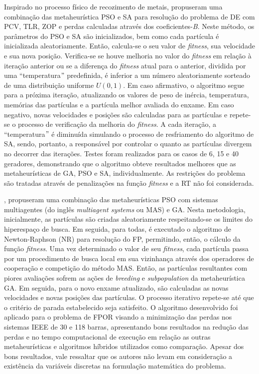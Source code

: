 \documentclass[
	12pt,				%
	openany,			%
	twoside,			%
	a4paper,			%
	chapter=TITLE,		%
	section=Title,		%
	subsection=Title,	%
	subsubsection=Title,%
	english,			%
	french,				%
	spanish,			%
	brazil			%
	]{abntex2}
\begin{document}
\begin{ERRATA}
Inspirado no processo físico de recozimento de metais,  propuseram uma combinação das metaheurística PSO e SA para resolução do problema de DE com PCV, TLR, ZOP e perdas calculadas através dos coeficientes-\emph{B}. Neste método, os parâmetros do PSO e SA são inicializados, bem como cada partícula é inicializada aleatoriamente. Então, calcula-se o seu valor de \emph{fitness}, sua velocidade e sua nova posição. Verifica-se se houve melhoria no valor do \emph{fitness} em relação à iteração anterior ou se a diferença do \emph{fitness} atual para o anterior, dividida por uma ``temperatura$"$ predefinida, é inferior a um número aleatoriamente sorteado de uma distribuição uniforme $U(0,1)$. Em caso afirmativo, o algoritmo segue para a próxima iteração, atualizando os valores de peso de inércia, temperatura, memórias das partículas e a partícula melhor avaliada do enxame. Em caso negativo, novas velocidades e posições são calculadas para as partículas e repete-se o processo de verificação da melhoria do \emph{fitness}. A cada iteração, a ``temperatura$"$ é diminuída simulando o processo de resfriamento do algoritmo de SA, sendo, portanto, a responsável por controlar o quanto as partículas divergem no decorrer das iterações. Testes foram realizados para os casos de 6, 15 e 40 geradores, demonstrando que o algoritmo obteve resultados melhores que as metaheurísticas de GA, PSO e SA, individualmente. As restrições do problema são tratadas através de penalizações na função \emph{fitness} e a RT não foi considerada.

, propuseram uma combinação das metaheurísticas PSO com sistemas multiagentes (do inglês \emph{multiagent systems} ou MAS) e GA. Nesta metodologia, inicialmente, as partículas são criadas aleatoriamente respeitando-se os limites do hiperespaço de busca. Em seguida, para todas, é executado o algoritmo de Newton-Raphson (NR) para resolução do FP, permitindo, então, o cálculo da função \emph{fitness}. Uma vez determinado o valor de seu \emph{fitness}, cada partícula passa por um procedimento de busca local em sua vizinhança através dos operadores de cooperação e competição do método MAS. Então, as partículas resultantes com piores avaliações sofrem as ações de \emph{breeding} e \emph{subpopulation} da metaheurística GA.  Em seguida, para o novo enxame atualizado, são calculadas as novas velocidades e novas posições das partículas. O processo iterativo repete-se até que o critério de parada estabelecido seja satisfeito. O algoritmo desenvolvido foi aplicado para o problema de FPOR visando a minimização das perdas nos sistemas IEEE de 30 e 118 barras, apresentando bons resultados na redução das perdas e no tempo computacional de execução em relação as outras metaheurísticas e algoritmos híbridos utilizados como comparação. Apesar dos bons resultados, vale ressaltar que os autores não levam em consideração a existência da variáveis discretas na formulação matemática do problema.


\end{ERRATA}
\end{document}
